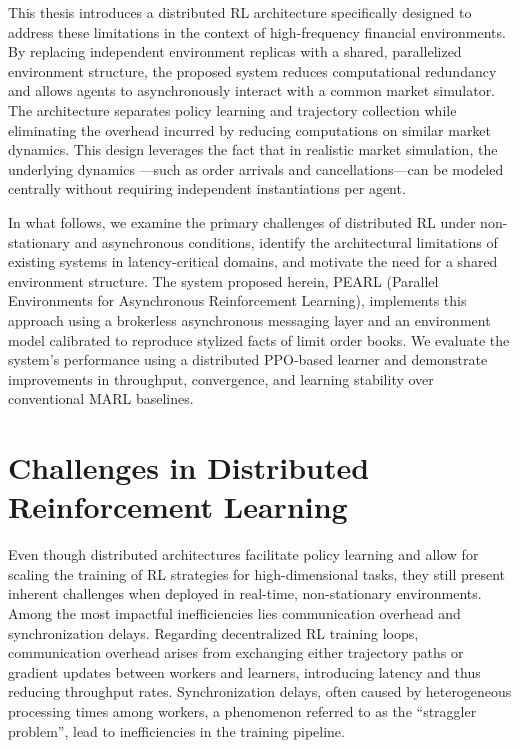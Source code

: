 This thesis introduces a distributed RL architecture specifically designed to address these limitations in the context of high-frequency financial environments.
By replacing independent environment replicas with a shared, parallelized environment structure,
the proposed system reduces computational redundancy and allows agents to asynchronously interact with a common market simulator.
The architecture separates policy learning and trajectory collection while eliminating the overhead incurred by reducing computations on similar market dynamics.
This design leverages the fact that in realistic market simulation, the underlying dynamics
---such as order arrivals and cancellations---can be modeled centrally without requiring independent instantiations per agent.

In what follows, we examine the primary challenges of distributed RL under non-stationary and asynchronous conditions,
identify the architectural limitations of existing systems in latency-critical domains, and motivate the need for a shared environment structure.
The system proposed herein, PEARL (Parallel Environments for Asynchronous Reinforcement Learning),
implements this approach using a brokerless asynchronous messaging layer and an environment model calibrated to reproduce stylized facts of limit order books.
We evaluate the system's performance using a distributed PPO-based learner and demonstrate improvements in
throughput, convergence, and learning stability over conventional MARL baselines.

\section{Challenges in Distributed Reinforcement Learning}
\label{sec:challenges}

Even though distributed architectures facilitate policy learning and allow for scaling the training of RL strategies for
high-dimensional tasks, they still present inherent challenges when deployed in real-time, non-stationary environments.
Among the most impactful inefficiencies lies communication overhead and synchronization delays.
Regarding decentralized RL training loops, communication overhead arises from exchanging either trajectory paths or gradient updates
between workers and learners, introducing latency and thus reducing throughput rates.
Synchronization delays, often caused by heterogeneous processing times among workers, a phenomenon referred to as the ``straggler problem'',
lead to inefficiencies in the training pipeline.

